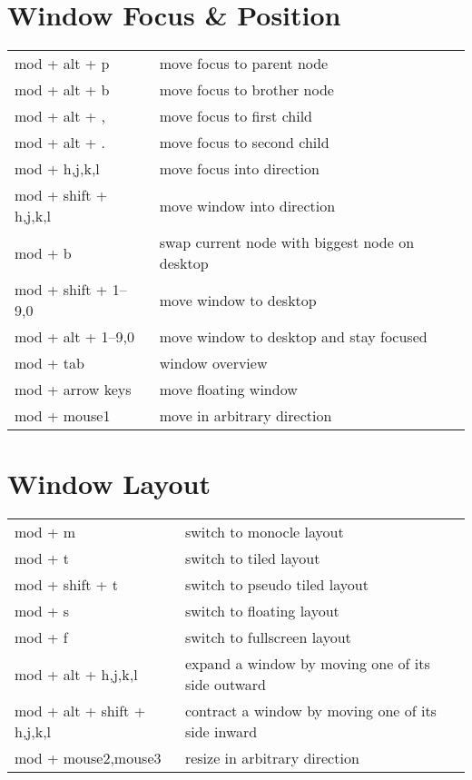 \documentclass[
    10pt,
    a4paper,
    notitlepage,
]{scrartcl}
\begin{document}
\section{Window Focus \& Position}
\begin{tabular}{p{4cm}l}
    mod + alt + p          & move focus to parent node \\
    mod + alt + b          & move focus to brother node \\
    mod + alt + ,          & move focus to first child \\
    mod + alt + .          & move focus to second child \\
    mod + h,j,k,l          & move focus into direction        \\
    mod + shift + h,j,k,l  & move window into direction        \\
    mod + b                & swap current node with biggest node on desktop \\
    mod + shift + 1--9,0   & move window to desktop         \\
    mod + alt + 1--9,0     & move window to desktop and stay focused       \\
    mod + tab              & window overview     \\
    mod + arrow keys       & move floating window              \\
    mod + mouse1           & move in arbitrary direction
\end{tabular}

\section{Window Layout}
\begin{tabular}{p{4cm}l}
    mod + m             & switch to monocle layout              \\
    mod + t             & switch to tiled layout                \\
    mod + shift + t     & switch to pseudo tiled layout         \\
    mod + s             & switch to floating layout             \\
    mod + f             & switch to fullscreen layout           \\
    mod + alt + h,j,k,l   & expand a window by moving one of its side outward        \\
    mod + alt + shift + h,j,k,l & contract a window by moving one of its side inward \\
    mod + mouse2,mouse3   & resize in arbitrary direction
\end{tabular}
\end{document}
